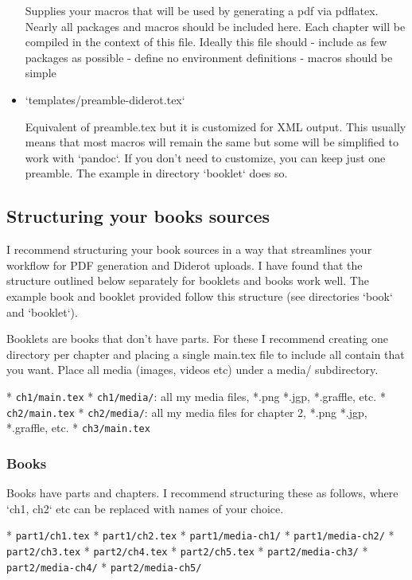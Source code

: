 \begin{example}
\begin{noten}
\begin{important}
\begin{definition}[Group]
\begin{itemize}
   Supplies your macros that will be used by generating a pdf via pdflatex.  Nearly all packages and macros should be included here.  Each chapter will be compiled in the context of this file.  Ideally this file should
   - include as few packages as possible
   - define no environment definitions
   - macros should be simple

\item `templates/preamble-diderot.tex` 

   Equivalent of preamble.tex but it is customized for XML output.  This usually means that most macros will remain the same but some will be simplified to work with `pandoc`.  If you don't need to customize, you can keep just one preamble.  The example in directory `booklet` does so.
\end{itemize}    

\subsection{Structuring your books sources}

I recommend structuring your book sources in a way that streamlines your workflow for PDF generation and Diderot uploads.  I have found that the structure outlined below separately for booklets and books work well.  The example book and booklet provided follow this structure (see directories `book` and `booklet`).

 
 Booklets are books that don't have parts. For these  I recommend creating one directory per chapter and placing a single main.tex file to include all contain that you want.  Place all media (images, videos etc) under a media/ subdirectory. 
\begin{itemize}  
* \lstinline`ch1/main.tex`
* \lstinline`ch1/media/`: all my media files, *.png *.jgp, *.graffle, etc.
* \lstinline`ch2/main.tex`
* \lstinline`ch2/media/`: all my media files for chapter 2, *.png *.jgp, *.graffle, etc.
* \lstinline`ch3/main.tex`
\end{itemize}

\subsubsection{Books}

Books have parts and chapters. I recommend structuring these as follows, where `ch1, ch2` etc can be replaced with names of your choice.

\begin{itemize}
* \lstinline`part1/ch1.tex`
* \lstinline`part1/ch2.tex`
* \lstinline`part1/media-ch1/`
* \lstinline`part1/media-ch2/`
* \lstinline`part2/ch3.tex`
* \lstinline`part2/ch4.tex`
* \lstinline`part2/ch5.tex`
* \lstinline`part2/media-ch3/`
* \lstinline`part2/media-ch4/`
* \lstinline`part2/media-ch5/`
\end{itemize}
   

\end{definition}
\end{important}
\end{noten}
\end{example}
